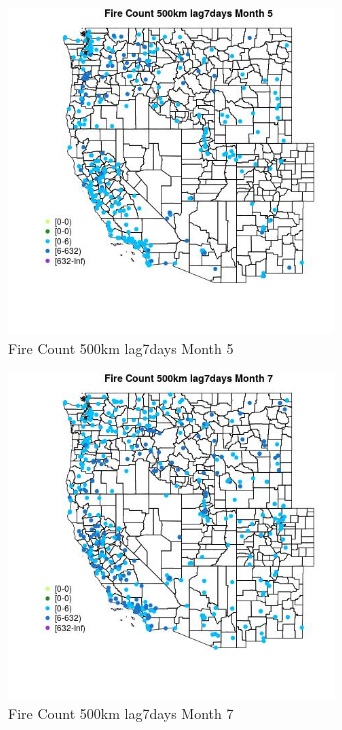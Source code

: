 \begin{figure} 
\centering  
\includegraphics[width=0.77\textwidth]{Code_Outputs/Report_ML_input_PM25_Step4_part_e_de_duplicated_aves_compiled_2019-05-18wNAs_MapObsMo5Fire_Count_500km_lag7days.jpg} 
\caption{\label{fig:Report_ML_input_PM25_Step4_part_e_de_duplicated_aves_compiled_2019-05-18wNAsMapObsMo5Fire_Count_500km_lag7days}Fire Count 500km lag7days Month 5} 
\end{figure} 
 

\begin{figure} 
\centering  
\includegraphics[width=0.77\textwidth]{Code_Outputs/Report_ML_input_PM25_Step4_part_e_de_duplicated_aves_compiled_2019-05-18wNAs_MapObsMo7Fire_Count_500km_lag7days.jpg} 
\caption{\label{fig:Report_ML_input_PM25_Step4_part_e_de_duplicated_aves_compiled_2019-05-18wNAsMapObsMo7Fire_Count_500km_lag7days}Fire Count 500km lag7days Month 7} 
\end{figure} 
 

